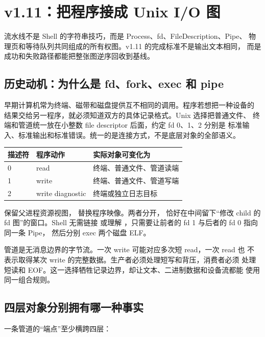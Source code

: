 \section{v1.11：把程序接成 Unix I/O 图}

\begin{keyidea}
流水线不是 Shell 的字符串技巧，而是 Process、fd、FileDescription、Pipe、
物理页和等待队列共同组成的所有权图。v1.11 的完成标准不是输出文本相同，
而是成功和失败路径都能把整张图逆序回收到基线。
\end{keyidea}

\subsection{历史动机：为什么是 fd、fork、exec 和 pipe}

早期计算机常为终端、磁带和磁盘提供互不相同的调用。程序若想把一种设备的
结果交给另一程序，就必须知道双方的具体记录格式。Unix 选择把普通文件、
终端和管道统一放在小整数 file descriptor 后面，约定 fd 0、1、2 分别是
标准输入、标准输出和标准错误。统一的是连接方式，不是底层对象的全部语义。

\begin{center}
\begin{tabular}{lll}
\toprule
描述符 & 程序动作 & 实际对象可变化为 \\
\midrule
0 & read & 终端、普通文件、管道读端 \\
1 & write & 终端、普通文件、管道写端 \\
2 & write diagnostic & 终端或独立日志目标 \\
\bottomrule
\end{tabular}
\end{center}

 保留父进程资源视图， 替换程序映像。两者分开，
恰好在中间留下“修改 child 的 fd 图”的窗口。Shell 无需链接 
或理解 ，只需要让前者的 fd 1 与后者的 fd 0 指向同一条 Pipe，
然后分别 exec 两个磁盘 ELF。

管道是无消息边界的字节流。一次 write 可能对应多次短 read，一次 read 也
不表示取得某次 write 的完整数据。生产者必须处理短写和背压，消费者必须
处理短读和 EOF。这一选择牺牲记录边界，却让文本、二进制数据和设备流都能
使用同一组合规则。

\subsection{四层对象分别拥有哪一种事实}

一条管道的“端点”至少横跨四层：

